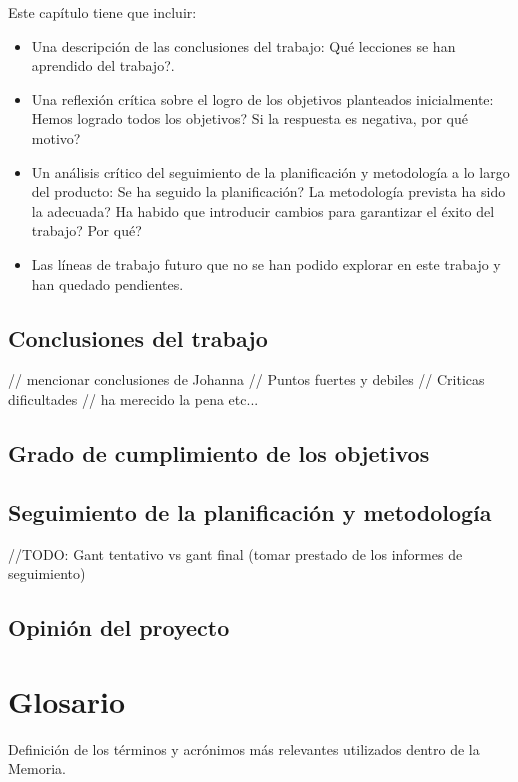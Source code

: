 \documentclass[11pt,a4paper]{article}
\begin{document}
Este capítulo tiene que incluir:
\begin{itemize}
\item Una descripción de las conclusiones del trabajo: Qué lecciones se han aprendido del trabajo?.
\item Una reflexión crítica sobre el logro de los objetivos planteados inicialmente: Hemos logrado todos los objetivos? Si la respuesta es negativa, por qué motivo? 
\item Un análisis crítico del seguimiento de la planificación y metodología a lo largo del producto: Se ha seguido la planificación? La metodología prevista ha sido la adecuada? Ha habido que introducir cambios para garantizar el éxito del trabajo? Por qué? 
\item Las líneas de trabajo futuro que no se han podido explorar en este trabajo y han quedado pendientes.
\end{itemize}

\subsection{Conclusiones del trabajo}
// mencionar conclusiones de Johanna
// Puntos fuertes y debiles
// Criticas dificultades
// ha merecido la pena etc...
\medskip 

\subsection{Grado de cumplimiento de los objetivos}
\medskip 

\subsection{Seguimiento de la planificación y metodología}\label{sec:seguiminetoPlanificacion}
//TODO: Gant tentativo vs gant final (tomar prestado de los informes de seguimiento)
\medskip 

\subsection{Opinión del proyecto}
\newpage 


\section{Glosario}
\bigskip

Definición de los términos y acrónimos más relevantes utilizados dentro de la Memoria. 
\newpage 
\end{document}
